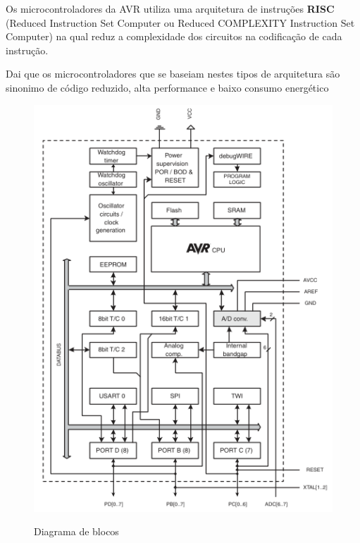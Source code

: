 \documentclass[titlepage, a4paper, 10pt, reqno, openany]{report}
\begin{document}
	Os microcontroladores da AVR utiliza uma arquitetura de instru\c{c}\~{o}es {\bf RISC} (Reduced Instruction Set Computer ou Reduced COMPLEXITY Instruction Set Computer) na qual reduz a complexidade dos circuitos na codifica\c{c}\~{a}o de cada instru\c{c}\~{a}o. \par
	Dai que os microcontroladores que se baseiam nestes tipos de arquitetura s\~{a}o sinonimo de c\'{o}digo reduzido, alta performance e baixo consumo energ\'{e}tico \par
	\begin{figure}[H]
		\centering
		\includegraphics[scale=1]{./image/ARCHITECTURE/Block_diagram.png}\\
		\caption{Diagrama de blocos}
		\label{Diagrama de blocos}
	\end{figure}
\end{document}
